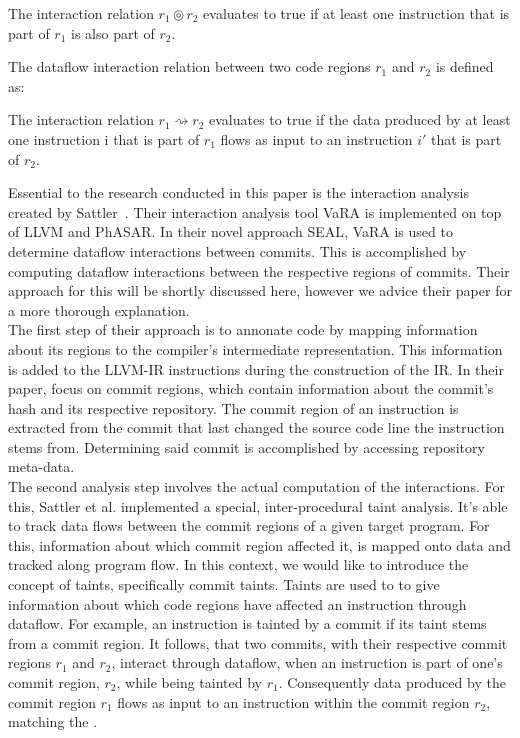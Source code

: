 \begin{definition}\label{def:structural_relation}
	The interaction relation $r_1 \circledcirc r_2$ evaluates to true if at least one instruction that is part of $r_1$
	is also part of $r_2$.
\end{definition}

The dataflow interaction relation between two code regions $r_1$ and $r_2$ is defined as:

\begin{definition}\label{def:dataflow_relation}
	The interaction relation $r_1 \rightsquigarrow r_2$ evaluates to true if the data produced by at least one instruction i that is part of $r_1$
	flows as input to an instruction $i'$ that is part of $r_2$.
\end{definition}

Essential to the research conducted in this paper is the interaction analysis created by Sattler~\cite{sattler2023thesis}.
Their interaction analysis tool VaRA is implemented on top of LLVM and PhASAR.
In their novel approach SEAL\cite{sattler2023seal}, VaRA is used to determine dataflow interactions between commits.
This is accomplished by computing dataflow interactions between the respective regions of commits.
Their approach for this will be shortly discussed here, however we advice their paper for a more thorough explanation. \\
The first step of their approach is to annonate code by mapping information about its regions to the compiler's intermediate representation.
This information is added to the LLVM-IR instructions during the construction of the IR.
In their paper, \citet{sattler2023seal} focus on commit regions, which contain information about the commit's hash and its respective repository.
The commit region of an instruction is extracted from the commit that last changed the source code line the instruction stems from.
Determining said commit is accomplished by accessing repository meta-data. \\
The second analysis step involves the actual computation of the interactions.
For this, Sattler et al. implemented a special, inter-procedural taint analysis.
It's able to track data flows between the commit regions of a given target program.
For this, information about which commit region affected it, is mapped onto data and tracked along program flow.
In this context, we would like to introduce the concept of taints, specifically commit taints.
Taints are used to to give information about which code regions have affected an instruction through dataflow.
For example, an instruction is tainted by a commit if its taint stems from a commit region.
It follows, that two commits, with their respective commit regions $r_1$ and $r_2$, interact through dataflow, when an instruction is part of one's commit region, $r_2$, while being tainted by $r_1$.
Consequently data produced by the commit region $r_1$ flows as input to an instruction within the commit region $r_2$, matching the \lowercase{}.

